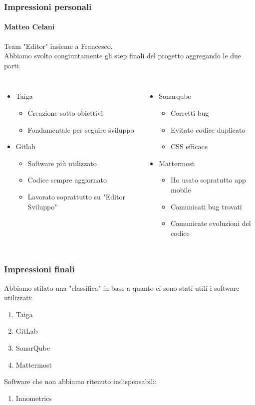 \documentclass{beamer}
\begin{document}
\begin{frame}
\frametitle{Impressioni personali}
\framesubtitle{Matteo Celani}
Team "Editor" insieme a Francesco. \\ Abbiamo svolto congiuntamente gli step finali del progetto aggregando le due parti.
\begin{columns}
  \begin{itemize}
	\item Taiga
		\begin{itemize}
			\item Creazione sotto obiettivi	
			\item Fondamentale per seguire sviluppo
 		 \end{itemize} 
	\item Gitlab 
		\begin{itemize}
			\item Software più utilizzato	
			\item Codice sempre aggiornato
			\item Lavorato soprattutto su "Editor Sviluppo"
 		 \end{itemize}
  \end{itemize}
\begin{itemize}
	\item Sonarqube 		
		\begin{itemize}
			\item Corretti bug	
			\item Evitato codice duplicato
			\item CSS efficace 
 		 \end{itemize}
	\item Mattermost 		\begin{itemize}
			\item Ho usato sopratutto app mobile 	
			\item Comunicati bug trovati
			\item Comunicate evoluzioni del codice
 		 \end{itemize} 
	  \end{itemize}
\end{columns}
\end{frame}

\begin{frame}
\frametitle{Impressioni finali}
Abbiamo stilato una "classifica" in base a quanto ci sono stati utili i software utilizzati:
  \begin{enumerate}
	\item Taiga
	\item GitLab
	\item SonarQube
	\item Mattermost
  \end{enumerate}
  Software che non abbiamo ritenuto indispensabili:
  \begin{enumerate}
	\item Innometrics
  \end{enumerate}
\end{frame}
\end{document}
